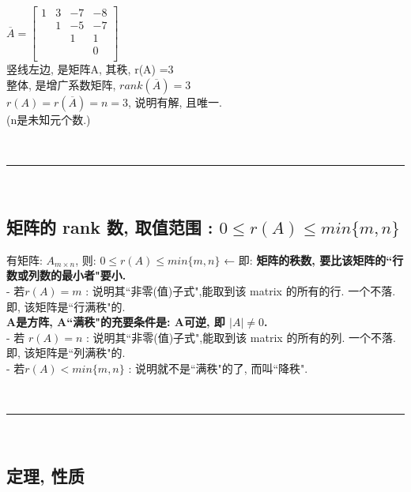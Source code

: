 \documentclass[UTF8]{ctexart}
\begin{document}
\begin{myEnvSample}
$\overline{A}=\left[ \begin{array}{ccc|c}
	1&		3&		-7&		-8\\
	&		1&		-5&		-7\\
	&		&		1&		1\\
	&		&		&		0\\
\end{array} \right]$\\

竖线左边, 是矩阵A, 其秩, r(A) =3 \\
整体, 是增广系数矩阵, $ rank(\overline{A}) = 3$ \\
$ r(A) =  r(\overline{A}) = n =  3 $, 说明有解, 且唯一. \\
(n是未知元个数.)
\end{myEnvSample}


~\\
\hrule
~\\

\subsection{矩阵的 rank 数, 取值范围 :  $\boxed{
		0 \le r(A) \le min \{m,n\}}$}

有矩阵: $A_{m \times n}$,  则: $\boxed{
	0 \le r(A) \le min \{m,n\}}$ ← 即: \textbf{矩阵的秩数, 要比该矩阵的``行数或列数的最小者"要小.}\\

- 若$ r(A)=m$ : 说明其``非零(值)子式",能取到该 matrix 的所有的行. 一个不落. 即, 该矩阵是``行满秩"的. \\
\textbf{A是方阵, A``满秩"的充要条件是: A可逆, 即 $ |A| \ne 0 $.}\\

- 若 $ r(A)=n$ : 说明其``非零(值)子式",能取到该 matrix 的所有的列. 一个不落. 即, 该矩阵是``列满秩"的.\\

- 若$r(A) < min\{m,n\}$ : 说明就不是``满秩"的了, 而叫``降秩".







~\\
\hrule
~\\



\subsection{定理, 性质}
\end{document}
